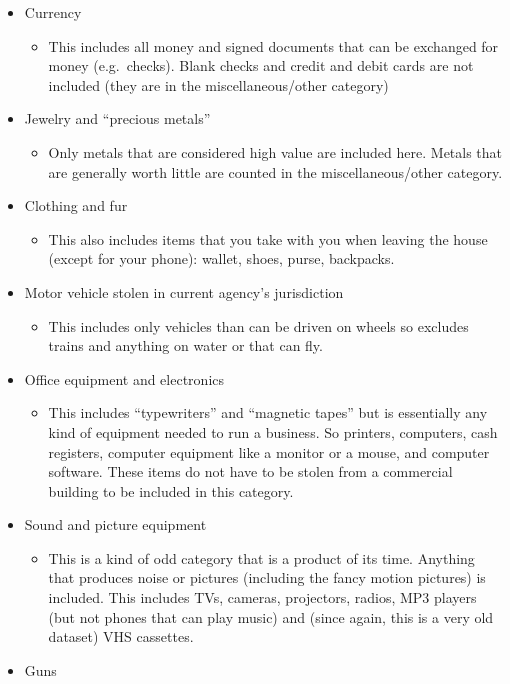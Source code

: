 \documentclass[
  12pt,
  openany]{book}
\providecommand{\tightlist}{%
  \setlength{\itemsep}{0pt}\setlength{\parskip}{0pt}}
\begin{document}
\begin{itemize}
\tightlist
\item
  Currency

  \begin{itemize}
  \tightlist
  \item
    This includes all money and signed documents that can be exchanged for money (e.g.~checks). Blank checks and credit and debit cards are not included (they are in the miscellaneous/other category)
  \end{itemize}
\item
  Jewelry and ``precious metals''

  \begin{itemize}
  \tightlist
  \item
    Only metals that are considered high value are included here. Metals that are generally worth little are counted in the miscellaneous/other category.
  \end{itemize}
\item
  Clothing and fur

  \begin{itemize}
  \tightlist
  \item
    This also includes items that you take with you when leaving the house (except for your phone): wallet, shoes, purse, backpacks.
  \end{itemize}
\item
  Motor vehicle stolen in current agency's jurisdiction

  \begin{itemize}
  \tightlist
  \item
    This includes only vehicles than can be driven on wheels so excludes trains and anything on water or that can fly.
  \end{itemize}
\item
  Office equipment and electronics

  \begin{itemize}
  \tightlist
  \item
    This includes ``typewriters'' and ``magnetic tapes'' but is essentially any kind of equipment needed to run a business. So printers, computers, cash registers, computer equipment like a monitor or a mouse, and computer software. These items do not have to be stolen from a commercial building to be included in this category.
  \end{itemize}
\item
  Sound and picture equipment

  \begin{itemize}
  \tightlist
  \item
    This is a kind of odd category that is a product of its time. Anything that produces noise or pictures (including the fancy motion pictures) is included. This includes TVs, cameras, projectors, radios, MP3 players (but not phones that can play music) and (since again, this is a very old dataset) VHS cassettes.
  \end{itemize}
\item
  Guns


\end{itemize}
\end{document}
